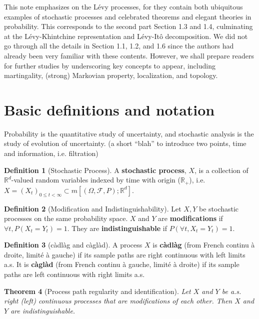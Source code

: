 \documentclass[openany,oneside]{book}
\newtheorem{thm}{Theorem}[section]
\theoremstyle{definition}
\newtheorem{defn}[thm]{Definition}
\theoremstyle{remark}
\newcommand{\R}{{\mathbb R}}%
\begin{document}
This note emphasizes on the L\'evy processes, for they contain both ubiquitous examples of stochastic processes and celebrated theorems and elegant theories in probability. This corresponds to the second part Section 1.3 and 1.4, culminating at the L\'evy-Khintchine representation and L\'evy-It\^o decomposition.  We did not go through all the details in Section 1.1, 1.2, and 1.6 since the authors had already been very familiar with these contents. However, we shall prepare readers for further studies by underscoring key concepts to appear, including martingality, (strong) Markovian property, localization, and topology.


\section{Basic definitions and notation}
Probability is the quantitative study of uncertainty, and stochastic analysis is the study of evolution of uncertainty. {\color{red}(a short ``blah'' to introduce two points, time and information, i.e. filtration)}

\begin{defn}[Stochastic Process]
A \textbf{stochastic process}, $X$, is a collection of $\R^d$-valued random variables indexed by time with origin ($\R_+$), i.e. $X=(X_t)_{0\leq t<\infty}\subset m[(\Omega,\mathcal{F},P);\R^d]$. 
\end{defn}


\begin{defn}[Modification and Indistinguishability]
Let $X,Y$ be stochastic processes on the same probability space. $X$ and $Y$ are \textbf{modifications} if $\forall t, P(X_t=Y_t)=1$. They are \textbf{indistinguishable} if $P(\forall t, X_t=Y_t)=1$.
\end{defn}

\begin{defn}[c{\`a}dl{\`a}g and c{\`a}gl{\`a}d]
A process $X$ is \textbf{c{\`a}dl{\`a}g} (from French continu \`a droite, limit\'e \`a gauche) if its sample paths are right continuous with left limits a.s. It is \textbf{c{\`a}gl{\`a}d} (from French continu \`a gauche, limit\'e \`a droite) if its sample paths are left continuous with right limits a.s.
\end{defn}

\begin{thm}[Process path regularity and identification]
Let $X$ and $Y$ be a.s. right (left) continuous processes that are modifications of each other. Then $X$ and $Y$ are indistinguishable.  
\end{thm}
\end{document}
